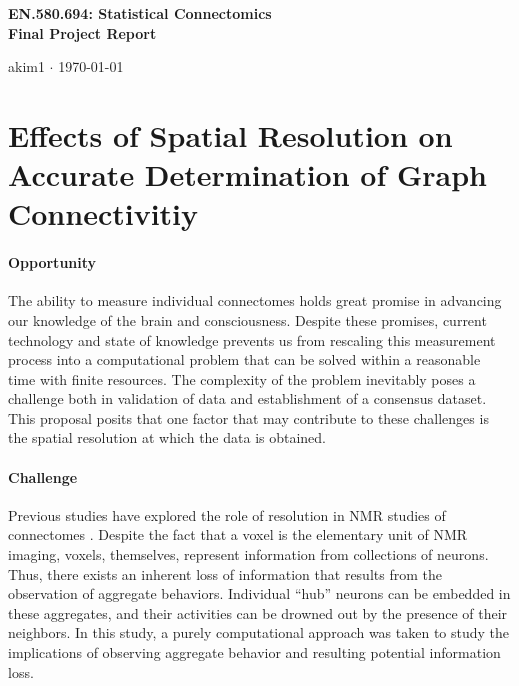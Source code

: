 \documentclass[12pt]{article}
\begin{document}
\begin{center}\Large \bf EN.580.694: Statistical Connectomics \\ Final Project Report \end{center}
\begin{center} akim1 $\cdot$  \today \end{center}
\bigskip

\section*{Effects of Spatial Resolution on Accurate Determination of Graph Connectivitiy}

\paragraph{Opportunity}
The ability to measure individual connectomes holds great promise in advancing
our knowledge of the brain and consciousness. Despite these promises, current
technology and state of knowledge prevents us from rescaling this measurement
process into a computational problem that can be solved within a reasonable
time with finite resources. The complexity of the problem inevitably poses a
challenge both in validation of data and establishment of a consensus dataset.
This proposal posits that one factor that may contribute to these challenges is
the spatial resolution at which the data is obtained.

\paragraph{Challenge}
Previous studies have explored the role of resolution in NMR studies of
connectomes \cite{cammoun2012mapping}. Despite the fact that a voxel is the
elementary unit of NMR imaging, voxels, themselves, represent information from
collections of neurons.  Thus, there exists an inherent loss of information
that results from the observation of aggregate behaviors.  Individual ``hub''
neurons \cite{crossley2014hubs} can be embedded in these aggregates, and their
activities can be drowned out by the presence of their neighbors. In this
study, a purely computational approach was taken to study the implications of
observing aggregate behavior and resulting potential information loss.
\end{document}
